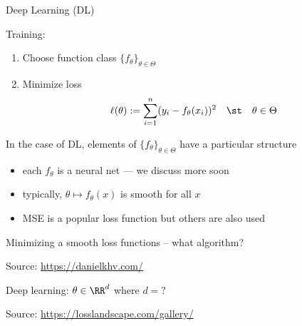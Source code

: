 \begin{frame}{Deep Learning (DL)}

    Training:

    \begin{enumerate}
        \item Choose function class $\{f_\theta\}_{\theta \in \Theta}$ 
            \vspace{0.4em}
        \item Minimize loss 
            \begin{equation*}
                \ell(\theta) := \sum_{i=1}^n (y_i - f_\theta(x_i))^2
                \quad \st \quad \theta \in \Theta
            \end{equation*}
    \end{enumerate}


    \pause
    \vspace{0.5em}
    In the case of DL, elements of $\{f_\theta\}_{\theta \in \Theta}$
    have a particular structure

    \begin{itemize}
        \item each $f_\theta$ is a neural net --- we discuss more soon
        \vspace{0.5em}
        \item typically, $\theta \mapsto f_\theta(x)$ is smooth for all $x$
        \vspace{0.5em}
        \item MSE is a popular loss function but others are also used
    \end{itemize}

\end{frame}


\begin{frame}
    

    Minimizing a smooth loss functions  -- what algorithm?
    
    \begin{figure}
       \begin{center}
       \end{center}
    \end{figure}

    Source: \url{https://danielkhv.com/}

\end{frame}


\begin{frame}

    Deep learning: $\theta \in \RR^d$ where $d = ?$
    
    \begin{figure}
       \begin{center}
       \end{center}
    \end{figure}

    Source: \url{https://losslandscape.com/gallery/}

\end{frame}




